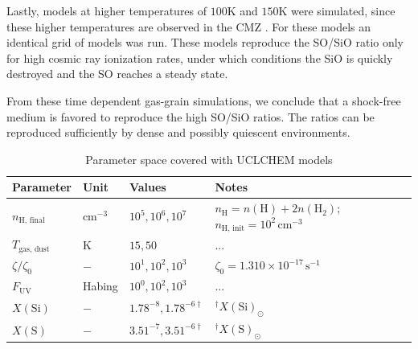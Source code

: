 \documentclass[]{aastex631}
\begin{document}
Lastly, models at higher temperatures of $100$K and $150$K were simulated, since these higher temperatures are observed in the CMZ \citep{ginsburgDenseGasGalactic2016,millsDetectionWidespreadHot2013,zengComplexOrganicMolecules2018a}.
For these models an identical grid of models was run. These models reproduce the SO/SiO ratio only for high cosmic ray ionization rates, under which conditions the SiO is quickly destroyed and the SO reaches a steady state.

From these time dependent gas-grain simulations, we conclude that a shock-free medium is favored to reproduce the high SO/SiO ratios.
The ratios can be reproduced sufficiently by dense and possibly quiescent environments.

 
\begin{table}[ht]
\caption{Parameter space covered with UCLCHEM models}
\label{tab:UCLCHEM}
\centering
\begin{tabular}{l|l|l|l}
\hline
\hline
Parameter                         & Unit      & Values             & Notes                                                                                              \\
\hline
$n_\mathrm{H,\,final}$            & cm$^{-3}$ & $10^5, 10^6, 10^7$ & $n_\mathrm{H} = n(\mathrm{H}) + 2n(\mathrm{H}_2)$; $n_\mathrm{H,\, init} = 10^2\,\mathrm{cm}^{-3}$ \\
$T_\mathrm{gas,\,dust}$           & K         & $15, 50$           & ...                                                                                                \\
$\zeta / \zeta_0$                 & $-$       & $10^1, 10^2, 10^3$    & $\zeta_0 = 1.310\times10^{-17}\,\mathrm{s}^{-1}$                                                           \\
$F_\mathrm{UV}$                   & Habing    & $10^0, 10^2, 10^3$     & ...                                                                                                \\
$X(\mathrm{Si})$    & $-$      &$1.78^{-8}, 1.78^{{-6}\dag}$ & $^\dag X(\mathrm{Si})_\odot$ \citep{Jenkins2009}  \\
$X(\mathrm{S})$     & $-$     & $3.51^{-7}, 3.51^{{-6}\dag}$     & $^\dag X(\mathrm{S})_\odot$ \citep{Jenkins2009}         \\
\hline
\end{tabular}
\end{table}
\end{document}
